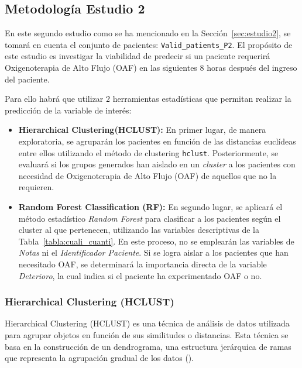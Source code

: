 \subsection{Metodología Estudio 2}\label{sec:metodologia-estudio-2}

En este segundo estudio como se ha mencionado en la Sección~\ref{sec:estudio2}, se tomará en cuenta el conjunto de pacientes: \texttt{Valid\_patients\_P2}. El propósito de este estudio es investigar la viabilidad de predecir si un paciente requerirá Oxigenoterapia de Alto Flujo (OAF) en las siguientes $8$ horas después del ingreso del paciente.

Para ello habrá que utilizar $2$ herramientas estadísticas que permitan realizar la predicción de la variable de interés:

\begin{itemize}
    \item \textbf{Hierarchical Clustering(HCLUST):} En primer lugar, de manera exploratoria, se agruparán los pacientes en función de las distancias euclídeas entre ellos utilizando el método de clustering \texttt{hclust}. Posteriormente, se evaluará si los grupos generados han aislado en un \textit{cluster} a los pacientes con necesidad de Oxigenoterapia de Alto Flujo (OAF) de aquellos que no la requieren.
    \item \textbf{Random Forest Classification (RF):} En segundo lugar, se aplicará el método estadístico \textit{Random Forest} para clasificar a los pacientes según el cluster al que pertenecen, utilizando las variables descriptivas de la Tabla~\ref{tabla:cuali_cuanti}. En este proceso, no se emplearán las variables de \textit{Notas} ni el \textit{Identificador Paciente}. Si se logra aislar a los pacientes que han necesitado OAF, se determinará la importancia directa de la variable \textit{Deterioro}, la cual indica si el paciente ha experimentado OAF o no.
\end{itemize}

\subsubsection{Hierarchical Clustering (HCLUST)}\label{sec:hclust}

Hierarchical Clustering (HCLUST) es una técnica de análisis de datos utilizada para agrupar objetos en función de sus similitudes o distancias. Esta técnica se basa en la construcción de un dendrograma, una estructura jerárquica de ramas que representa la agrupación gradual de los datos (\cite{jain1988algorithms}).


